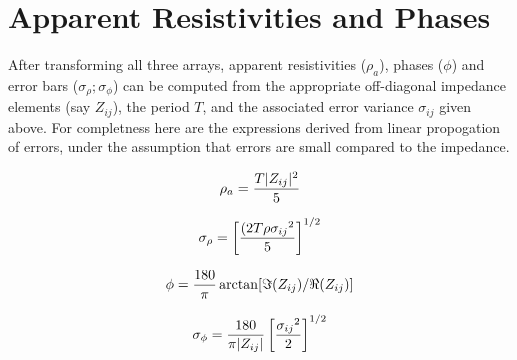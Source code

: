 \section{Apparent Resistivities and Phases}

After transforming all three arrays,
apparent resistivities ($\rho_a$), phases ($\phi$) and error
bars ($\sigma_{\rho}; \sigma_{\phi}$) can be computed from 
the appropriate off-diagonal impedance
elements (say $Z_{ij}$), the period $T$,
and the associated error variance $\sigma_{ij}$ given above.
For completness here are the expressions derived from linear
propogation of errors, under the assumption that errors are small
compared to the impedance.

$$
\rho_a = { { T | Z_{ij} |^2 } \over {5} }
$$

$$
\sigma_{\rho} = \left [ {{ ( 2T \rho {\sigma_{ij}}^2 } \over 5 } \right ]
\sp {1/2}
$$

$$
\phi = { 180 \over \pi }  \arctan [ \Im ( Z_{ij} ) / \Re ( Z_{ij} ) ] 
$$

$$
\sigma_{\phi}  = { 180 \over { \pi | Z_{ij} | } }
\left [ { {\sigma_{ij}}^2 \over 2 }
\right ] \sp {1/2}
$$



